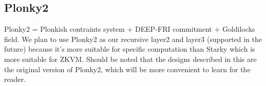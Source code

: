 \subsection{Plonky2} \label{sec:Plonky2}

Plonky2\cite{website:plonky2} = Plonkish contraints system + DEEP-FRI commitment + Goldilocks field. We plan to use Plonky2 as our recursive layer2 and layer3 (supported in the future) because it's more suitable for specific computation than Starky which is more suitable for ZKVM. Should be noted that the designs described in this are the original version of Plonky2, which will be more convenient to learn for the reader.




